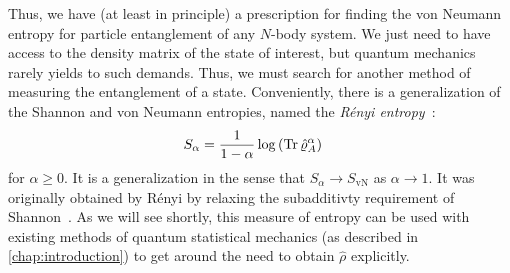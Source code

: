 Thus, we have (at least in principle) a prescription for finding the von Neumann entropy for particle entanglement of any $N$-body system.
We just need to have access to the density matrix of the state of interest, but quantum mechanics rarely yields to such demands.
Thus, we must search for another method of measuring the entanglement of a state.
Conveniently, there is a generalization of the Shannon and von Neumann entropies, named the \emph{Rényi entropy}~\cite{herdman2014path,renyi1961measures}:
\begin{align}
	S_\alpha
	&= \frac{1}{1 - \alpha} \log{\left( \operatorname{Tr}{\hat{\varrho}_A^\alpha} \right)}
\end{align}
for $\alpha \ge 0$.
It is a generalization in the sense that $S_\alpha \to S_\mathrm{vN}$ as $\alpha \to 1$.
It was originally obtained by Rényi by relaxing the subadditivty requirement of Shannon~\cite{shannon1948mathematical,renyi1961measures}.
As we will see shortly, this measure of entropy can be used with existing methods of quantum statistical mechanics (as described in \cref{chap:introduction}) to get around the need to obtain $\hat{\rho}$ explicitly.





